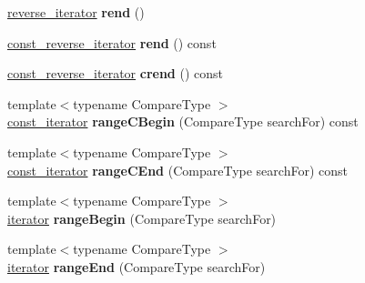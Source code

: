 \begin{DoxyCompactItemize}
\item 
\hypertarget{classbalanced__tree_a735d0e737b3df44bf1d5289ae7c2cf88}{\hyperlink{classbalanced__tree_1_1reverse__iterator}{reverse\+\_\+iterator} {\bfseries rend} ()}\label{classbalanced__tree_a735d0e737b3df44bf1d5289ae7c2cf88}

\item 
\hypertarget{classbalanced__tree_aecf8b1cd7a3905dd0ddd0f56d027b310}{\hyperlink{classbalanced__tree_1_1const__reverse__iterator}{const\+\_\+reverse\+\_\+iterator} {\bfseries rend} () const }\label{classbalanced__tree_aecf8b1cd7a3905dd0ddd0f56d027b310}

\item 
\hypertarget{classbalanced__tree_a32844756c0d4ad2d6593ffd604657eec}{\hyperlink{classbalanced__tree_1_1const__reverse__iterator}{const\+\_\+reverse\+\_\+iterator} {\bfseries crend} () const }\label{classbalanced__tree_a32844756c0d4ad2d6593ffd604657eec}

\item 
\hypertarget{classbalanced__tree_aa4082447657c64cc6fa7be703b344d69}{{\footnotesize template$<$typename Compare\+Type $>$ }\\\hyperlink{classbalanced__tree_1_1const__iterator}{const\+\_\+iterator} {\bfseries range\+C\+Begin} (Compare\+Type search\+For) const }\label{classbalanced__tree_aa4082447657c64cc6fa7be703b344d69}

\item 
\hypertarget{classbalanced__tree_a2849b7ccfbea363bd8031ddf1dd2f522}{{\footnotesize template$<$typename Compare\+Type $>$ }\\\hyperlink{classbalanced__tree_1_1const__iterator}{const\+\_\+iterator} {\bfseries range\+C\+End} (Compare\+Type search\+For) const }\label{classbalanced__tree_a2849b7ccfbea363bd8031ddf1dd2f522}

\item 
\hypertarget{classbalanced__tree_a78c125c9c702a2ac9daa20c6eeb7eb84}{{\footnotesize template$<$typename Compare\+Type $>$ }\\\hyperlink{classbalanced__tree_1_1iterator}{iterator} {\bfseries range\+Begin} (Compare\+Type search\+For)}\label{classbalanced__tree_a78c125c9c702a2ac9daa20c6eeb7eb84}

\item 
\hypertarget{classbalanced__tree_aee8c68c0cd8871002bff37643f57e727}{{\footnotesize template$<$typename Compare\+Type $>$ }\\\hyperlink{classbalanced__tree_1_1iterator}{iterator} {\bfseries range\+End} (Compare\+Type search\+For)}\label{classbalanced__tree_aee8c68c0cd8871002bff37643f57e727}

\end{DoxyCompactItemize}

